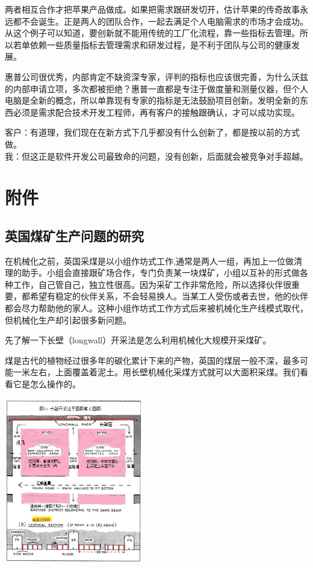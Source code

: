 两者相互合作才把苹果产品做成。如果把需求跟研发切开，估计苹果的传奇故事永远都不会诞生。正是两人的团队合作，一起去满足个人电脑需求的市场才会成功。从这个例子可以知道，要创新就不能用传统的工厂化流程，靠一些指标去管理。所以若单依赖一些质量指标去管理需求和研发过程，是不利于团队与公司的健康发展。

惠普公司很优秀，内部肯定不缺资深专家，评判的指标也应该很完善，为什么沃兹的内部申请立项，多次都被拒绝？惠普一直都是专注于做度量和测量仪器，但个人电脑是全新的概念，所以单靠现有专家的指标是无法鼓励项目创新。发明全新的东西必须是需求配合技术开发工程师，再有客户的接触跟确认，才可以成功实现。

客户：有道理，我们现在在新方式下几乎都没有什么创新了，都是按以前的方式做。\\
我：但这正是软件开发公司最致命的问题，没有创新，后面就会被竞争对手超越。\\

\hypertarget{ux9644ux4ef6}{%
\section{附件}\label{ux9644ux4ef6}}

\hypertarget{ux82f1ux56fdux7164ux77ffux751fux4ea7ux95eeux9898ux7684ux7814ux7a76}{%
\subsection{英国煤矿生产问题的研究}\label{ux82f1ux56fdux7164ux77ffux751fux4ea7ux95eeux9898ux7684ux7814ux7a76}}

在机械化之前，英国采煤是以小组作坊式工作,通常是两人一组，再加上一位做清理的助手。小组会直接跟矿场合作，专门负责某一块煤矿，小组以互补的形式做各种工作，自己管自己，独立性很高。因为采矿工作非常危险，所以选择伙伴很重要，都希望有稳定的伙伴关系，不会轻易换人。当某工人受伤或者去世，他的伙伴都会尽力帮助他的家人。这种小组作坊式工作方式后来被机械化生产线模式取代，但机械化生产却引起很多新问题。

先了解一下长壁（longwall）开采法是怎么利用机械化大规模开采煤矿。

煤是古代的植物经过很多年的碳化累计下来的产物，英国的煤层一般不深，最多可能一米左右，上面覆盖着泥土。用长壁机械化采煤方式就可以大面积采煤。我们看看它是怎么操作的。


\includegraphics[width=6cm]{langwall-修改562.jpg}

